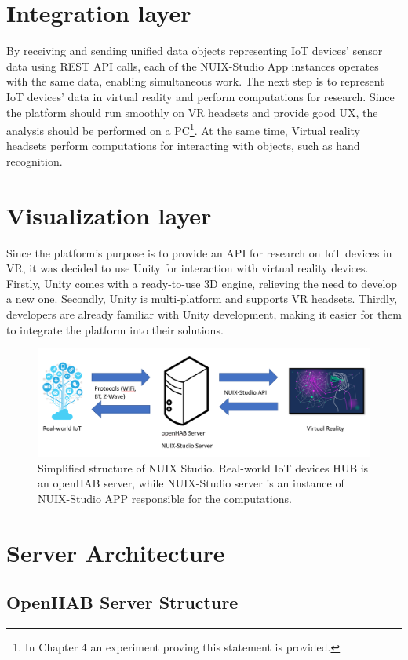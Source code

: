 \section{Integration layer}
By receiving and sending unified data objects representing IoT devices' sensor data using REST API calls, each of the NUIX-Studio App instances operates with the same data, enabling simultaneous work.
The next step is to represent IoT devices' data in virtual reality and perform computations for research. Since the platform should run smoothly on VR headsets and provide good UX, the analysis should be performed on a PC\footnote{In Chapter 4 an experiment proving this statement is provided.}. At the same time, Virtual reality headsets perform computations for interacting with objects, such as hand recognition. 

\section{Visualization layer}
Since the platform's purpose is to provide an API for research on IoT devices in VR, it was decided to use Unity for interaction with virtual reality devices. Firstly, Unity comes with a ready-to-use 3D engine, relieving the need to develop a new one. Secondly, Unity is multi-platform and supports VR headsets. Thirdly, developers are already familiar with Unity development, making it easier for them to integrate the platform into their solutions.

\begin{figure}
  \centering
  \includegraphics[width=0.6\linewidth]{figures/BasicPlatformStructure.png}
  \caption{Simplified structure of NUIX Studio. Real-world IoT devices HUB is an openHAB server, while NUIX-Studio server is an instance of NUIX-Studio APP responsible for the computations.}
  \label{fig:BasicPlatformStructure-figure}
\end{figure}

\section{Server Architecture}
\subsection{OpenHAB Server Structure}


